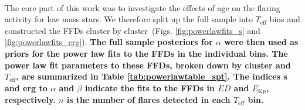 \documentclass{aa}
\begin{document}
\\
The core part of this work was to investigate the effects of age on the flaring activity for low mass stars. We therefore split up the full sample into $T_\mathrm{eff}$ bins and constructed the FFDs cluster by cluster~(Figs. \ref{fig:powerlawfits_s} and \ref{fig:powerlawfits_erg}). \textbf{The full sample posteriors for $\alpha$ were then used as priors for the power law fits to the FFDs in the individual bins. The power law fit parameters to these FFDs, broken down by cluster and $T_\mathrm{eff}$, are summarized in Table \ref{tab:powerlawtable_spt}. The indices s and erg to $\alpha$ and $\beta$ indicate the fits to the FFDs in $ED$ and $E_\mathrm{Kp}$, respectively. $n$ is the number of flares detected in each $T_\mathrm{eff}$ bin. }
\end{document}
